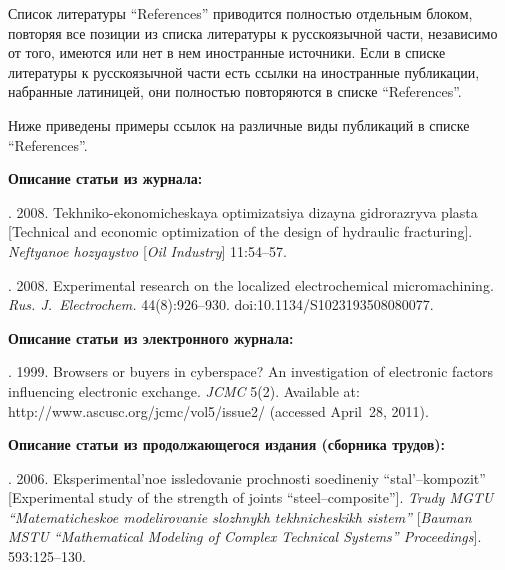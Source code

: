 {\begin{enumerate}[1.]
Список литературы ``References'' приводится полностью отдельным блоком, повторяя все
позиции из списка литературы к русскоязычной части, независимо от того, имеются или
нет в нем иностранные источники. Если в списке литературы к русскоязычной части есть
ссылки на иностранные публикации, набранные латиницей, они полностью повторяются в
списке ``References''.

Ниже приведены примеры ссылок на различные виды публикаций в списке ``References''.

\def\leftfootline{\small{\textbf{\thepage}
\hfill ИНФОРМАТИКА И ЕЁ ПРИМЕНЕНИЯ\ \ \ том\ 14\ \ \ выпуск\ 3\ \ \ 2020}
}%
 \def\rightfootline{\small{ИНФОРМАТИКА И ЕЁ ПРИМЕНЕНИЯ\ \ \ том\ 14\ \ \ выпуск\ 3\ \ \ 2020
\hfill \textbf{\thepage}}}

{\small

\noindent
\textbf{Описание статьи из журнала:}

. 2008.
Tekhniko-ekonomicheskaya optimizatsiya dizayna gidrorazryva plasta [Technical and
economic optimization of the design
of hydraulic fracturing]. \textit{Neftyanoe hozyaystvo} [\textit{Oil Industry}] 11:54--57.

. 2008. Experimental research on the localized
electrochemical micromachining. \textit{Rus. J.~Electrochem.}  44(8):926--930.
{\sf doi:10.1134/S1023193508080077}.

\noindent
\textbf{Описание статьи из электронного журнала:}

. 1999. Browsers or buyers in cyberspace? An
investigation of electronic factors influencing electronic exchange. \textit{JCMC}
5(2). Available at: {\sf http://www.ascusc.org/jcmc/vol5/issue2/} (accessed April~28, 2011).

\def\leftkol{Правила подготовки рукописей  для публикации в журнале
<<Информатика и её применения>>}

\def\rightkol{Правила подготовки рукописей  для публикации в журнале
<<Информатика и её применения>>}


\noindent
\textbf{Описание статьи из продолжающегося издания (сборника трудов):}

. 2006. Eksperimental'noe
issledovanie prochnosti soedineniy ``stal'--kompozit'' [Experimental study of
the strength of joints ``steel--composite'']. \textit{Trudy MGTU
``Matematicheskoe modelirovanie slozhnykh tekh\-ni\-che\-skikh sistem''}
[\textit{Bauman MSTU ``Mathematical Modeling of Complex Technical
Systems'' Proceedings}]. 593:125--130.


}
\end{enumerate}}
